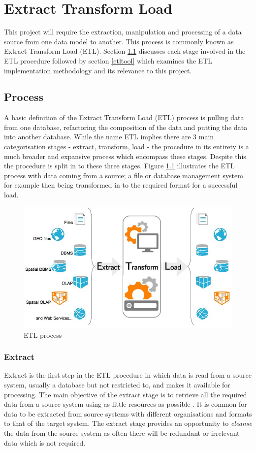 \chapter{Extract Transform Load}\label{etl}
This project will require the extraction, manipulation and processing of a data source from one data model to another. This process is commonly known as Extract Transform Load (ETL). Section \ref{etlprocess} discusses each stage involved in the ETL procedure followed by section \ref{etltool} which examines the ETL implementation methodology and its relevance to this project. 

\section{Process}\label{etlprocess}
A basic definition of the Extract Transform Load (ETL) process is pulling data from one database, refactoring the composition of the data and putting the data into another database. While the name ETL implies there are 3 main categorisation stages - extract, transform, load - the procedure in its entirety is a much broader and expansive process which encompass these stages. Despite this the procedure is split in to these three stages. Figure \ref{fig:etl} illustrates the ETL process with data coming from a source; a file or database management system for example then being transformed in to the required format for a successful load. \begin{figure}[h]\begin{center}\includegraphics[width=0.8\linewidth]{images/etl.jpg}\caption{ETL process}\label{fig:etl}\end{center}\end{figure}

\subsection{Extract}
Extract is the first step in the ETL procedure in which data is read from a source system, usually a database but not restricted to, and makes it available for processing. The main objective of the extract stage is to retrieve all the required data from a source system using as little resources as possible \cite{etlref1}. It is common for data to be extracted from source systems with different organisations and formats to that of the target system. The extract stage provides an opportunity to \textit{cleanse} the data from the source system as often there will be redundant or irrelevant data which is not required.


